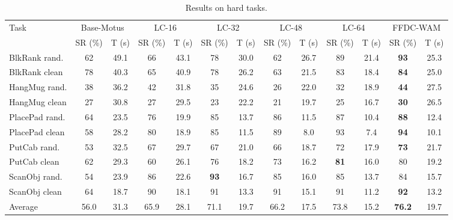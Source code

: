 \documentclass{article}
\begin{document}
\begin{table}[h]
\renewcommand{\arraystretch}{1}
\centering
\setlength{\tabcolsep}{1.25pt}
\caption{Results on hard tasks.}
\label{tab:hard_results}
\begin{tabular}{@{}lcccccccccccc@{}}
\toprule
\multirow{2}{*}{Task}
& \multicolumn{2}{c}{Base-Motus}
& \multicolumn{2}{c}{LC-16}
& \multicolumn{2}{c}{LC-32}
& \multicolumn{2}{c}{LC-48}
& \multicolumn{2}{c}{LC-64}
& \multicolumn{2}{c}{FFDC-WAM} \\
\cmidrule(lr){2-3}
\cmidrule(lr){4-5}
\cmidrule(lr){6-7}
\cmidrule(lr){8-9}
\cmidrule(lr){10-11}
\cmidrule(lr){12-13}
& SR (\%) & T (s)
& SR (\%) & T (s)
& SR (\%) & T (s)
& SR (\%) & T (s)
& SR (\%) & T (s)
& SR (\%) & T (s) \\
\midrule
BlkRank rand.  & 62 & 49.1 & 66 & 43.1 & 78 & 30.0 & 62 & 26.7 & 89 & 21.4 & \textbf{93} & 25.3 \\
BlkRank clean  & 78 & 40.3 & 65 & 40.9 & 78 & 26.2 & 63 & 21.5 & 83 & 18.4 & \textbf{84} & 25.0 \\
HangMug rand.  & 38 & 36.2 & 42 & 31.8 & 35 & 24.6 & 26 & 22.0 & 32 & 18.9 & \textbf{44} & 27.5 \\
HangMug clean  & 27 & 30.8 & 27 & 29.5 & 23 & 22.2 & 21 & 19.7 & 25 & 16.7 & \textbf{30} & 26.5 \\
PlacePad rand. & 64 & 23.5 & 76 & 19.9 & 85 & 13.7 & 86 & 11.5 & 87 & 10.4 & \textbf{88} & 12.4 \\
PlacePad clean & 58 & 28.2 & 80 & 18.9 & 85 & 11.5 & 89 & 8.0 & 93 & 7.4 & \textbf{94} & 10.1 \\
PutCab rand.   & 53 & 32.5 & 67 & 29.7 & 67 & 21.0 & 66 & 18.7 & 72 & 17.9 & \textbf{73} & 21.7 \\
PutCab clean   & 62 & 29.3 & 60 & 26.1 & 76 & 18.2 & 73 & 16.2 & \textbf{81} & 16.0 & 80 & 19.2 \\
ScanObj rand.  & 54 & 23.9 & 86 & 22.6 & \textbf{93} & 16.7 & 85 & 16.0 & 85 & 13.7 & 84 & 15.7 \\
ScanObj clean  & 64 & 18.7 & 90 & 18.1 & 91 & 13.3 & 91 & 15.1 & 91 & 11.2 & \textbf{92} & 13.2 \\
\midrule
Average   & 56.0 & 31.3 & 65.9 & 28.1 & 71.1 & 19.7 & 66.2 & 17.5 & 73.8 & 15.2 & \textbf{76.2}  & 19.7 \\
\bottomrule
\end{tabular}
\end{table}
\end{document}
